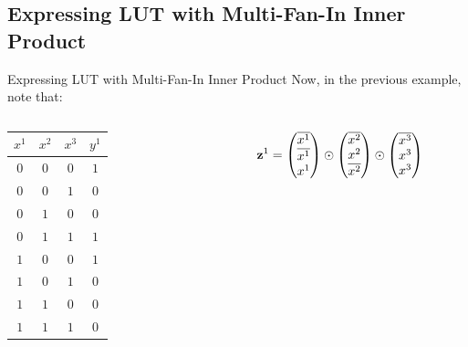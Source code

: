 \documentclass[../240906_cryptlab_flute.tex]{subfiles}
\begin{document}
\subsection{Expressing LUT with Multi-Fan-In Inner Product}
\begin{frame}{Expressing LUT with Multi-Fan-In Inner Product}
    Now, in the previous example, note that:
    \begin{columns}
        \begin{column}{.4\textwidth}
            \begin{table}[H]
                \centering
                \begin{tabular}{ccc|c}
                \(x^1\) & \(x^2\) & \(x^3\) & \(y^1\) \\ \hline
                \(0\)   & \(0\)   & \(0\)   & \(1\)   \\
                \(0\)   & \(0\)   & \(1\)   & \(0\)   \\
                \(0\)   & \(1\)   & \(0\)   & \(0\)   \\
                \(0\)   & \(1\)   & \(1\)   & \(1\)   \\
                \(1\)   & \(0\)   & \(0\)   & \(1\)   \\
                \(1\)   & \(0\)   & \(1\)   & \(0\)   \\
                \(1\)   & \(1\)   & \(0\)   & \(0\)   \\
                \(1\)   & \(1\)   & \(1\)   & \(0\)
                \end{tabular}
            \end{table}
        \end{column}
        \begin{column}{.5\textwidth}
            \small
            \begin{align*}
                \vec{z}^1
                &= \begin{pmatrix} \ol{x^1} \\ \ol{x^1} \\ x^1 \end{pmatrix}
                   \odot \begin{pmatrix} \ol{x^2} \\ x^2 \\ \ol{x^2} \end{pmatrix}
                   \odot \begin{pmatrix} \ol{x^3} \\ x^3 \\ x^3 \end{pmatrix} \\

\end{align*}
\end{column}
\end{columns}
\end{frame}
\end{document}
